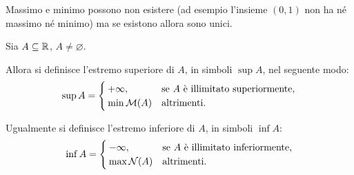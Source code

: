 \begin{remark}
    Massimo e minimo possono non esistere (ad esempio l'insieme $(0, 1)$ non ha né massimo né minimo) ma se esistono allora sono unici.
\end{remark}

\begin{definition}
    Sia $A \subseteq \mathbb{R}$, $A \neq \varnothing$. 

    Allora si definisce l'estremo superiore di $A$, in simboli $\sup A$, nel seguente modo: \[
        \sup A = \begin{cases}
            +\infty,    &\text{se $A$ è illimitato superiormente,}\\
            \min \mathcal{M}(A) &\text{altrimenti.}
        \end{cases}    
    \]
    
    Ugualmente si definisce l'estremo inferiore di $A$, in simboli $\inf A$: \[
        \inf A = \begin{cases}
            -\infty,    &\text{se $A$ è illimitato inferiormente,}\\
            \max \mathcal{N}(A) &\text{altrimenti.}
        \end{cases}    
    \]
\end{definition}

